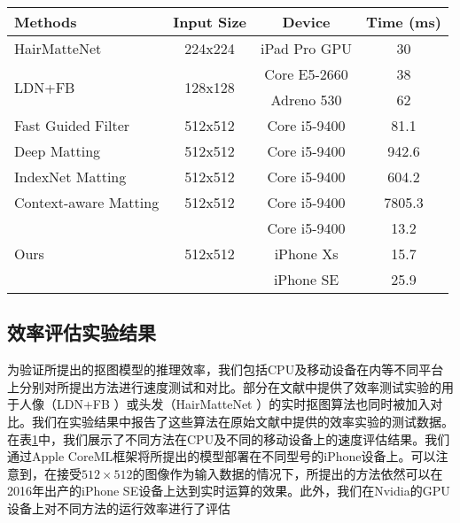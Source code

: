 \begin{table}[t]
	\setlength{\tabcolsep}{8pt}
	\centering
	\begin{tabular}{lccc}  
		\toprule
		Methods  & Input Size&  Device & Time (ms)   \\
		\midrule\midrule
		HairMatteNet\cite{levinshtein2018real}& 224x224& iPad Pro GPU & 30   \\
		\midrule
		\multirow{2}{*}{LDN+FB\cite{zhu2017fast}} &\multirow{2}{*}{128x128}  &  Core E5-2660 & 38  \\
		&&  Adreno 530 & 62  \\
		\midrule
		\midrule
		Fast Guided Filter\cite{he2015fast} &512x512 & Core i5-9400 & 81.1  \\
		\midrule
		Deep Matting\cite{xu2017deep}& 512x512& Core i5-9400 & 942.6  \\
		\midrule
		IndexNet Matting\cite{lu2019indices} &512x512	& Core i5-9400 & 604.2  \\
		\midrule
		Context-aware Matting\cite{hou2019context}& 512x512	& Core i5-9400 & 7805.3  \\
		\midrule
		\multirow{3}{*}{Ours} &\multirow{3}{*}{512x512}& Core i5-9400 & 13.2  \\
		&& iPhone Xs   & 15.7  \\
		&& iPhone SE  & 25.9   \\
		\bottomrule
	\end{tabular}
	\label{tab6:time_mobie}
\end{table}

\subsection{效率评估实验结果}
为验证所提出的抠图模型的推理效率，我们包括CPU及移动设备在内等不同平台上分别对所提出方法进行速度测试和对比。部分在文献中提供了效率测试实验的用于人像（LDN+FB \cite{zhu2017fast}）或头发（HairMatteNet \cite{levinshtein2018real}）的实时抠图算法也同时被加入对比。我们在实验结果中报告了这些算法在原始文献中提供的效率实验的测试数据。在表\ref{tab6:time_mobie}中，我们展示了不同方法在CPU及不同的移动设备上的速度评估结果。我们通过Apple CoreML框架将所提出的模型部署在不同型号的iPhone设备上。可以注意到，在接受$512\times512$的图像作为输入数据的情况下，所提出的方法依然可以在2016年出产的iPhone SE设备上达到实时运算的效果。此外，我们在Nvidia的GPU设备上对不同方法的运行效率进行了评估

